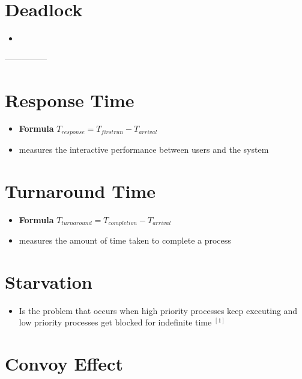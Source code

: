 \documentclass[12pt]{article}
\begin{document}
\section{Deadlock}

\begin{itemize}
    \item
\end{itemize}

---------------

\section{Response Time}
\begin{itemize}
    \item \textbf{Formula} $T_{response} = T_{firstrun} - T_{arrival}$
    \item measures the interactive performance between users and the system
\end{itemize}

\section{Turnaround Time}

\begin{itemize}
    \item \textbf{Formula} $T_{turnaround} = T_{completion} - T_{arrival}$
    \item measures the amount of time taken to complete a process
\end{itemize}

\section{Starvation}

\begin{itemize}
    \item Is the problem that occurs when high priority processes keep
    executing and low priority processes get blocked for indefinite time $^{[1]}$
\end{itemize}

\section{Convoy Effect}
\end{document}

